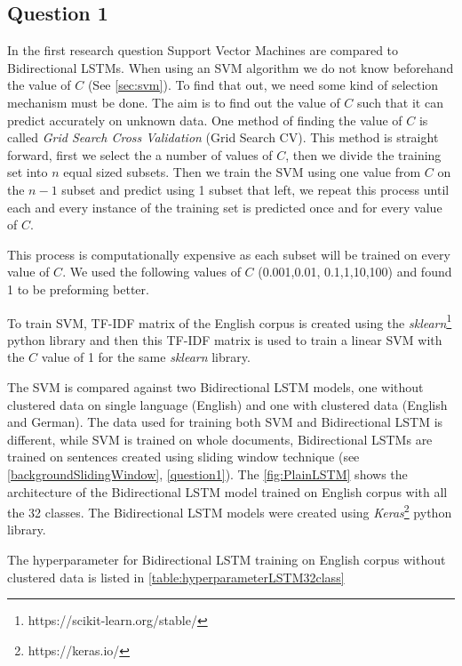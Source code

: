 \subsection{Question 1} \label{impQuestion1}

In the first research question Support Vector Machines are compared to Bidirectional LSTMs. When using an SVM algorithm we do not know beforehand the value of $C$ (See \ref{sec:svm}). To find that out, we need some kind of selection mechanism must be done. The aim is to find out the value of $C$ such that it can predict accurately on unknown data. One method of finding the value of $C$ is called \textit{Grid Search Cross Validation} (Grid Search CV). This method is straight forward, first we select the a number of values of $C$, then we divide the training set into $n$ equal sized subsets. Then we train the SVM using one value from $C$ on the $n-1$ subset and predict using 1 subset that left, we repeat this process until each and every instance of the training set is predicted once and for every value of $C$.

This process is computationally expensive as each subset will be trained on every value of $C$. We used the following values of $C$ (0.001,0.01, 0.1,1,10,100) and found 1 to be preforming better.

To train SVM, TF-IDF matrix of the English corpus is created using the \textit{sklearn}\footnote{https://scikit-learn.org/stable/} python library and then this TF-IDF matrix is used to train a linear SVM with the $C$ value of 1 for the same \textit{sklearn} library. 

The SVM is compared against two Bidirectional LSTM models, one without clustered data on single language (English) and one with clustered data (English and German). The data used for training both SVM and Bidirectional LSTM is different, while SVM is trained on whole documents, Bidirectional LSTMs are trained on sentences created using sliding window technique (see \ref{backgroundSlidingWindow}, \ref{question1}). The \ref{fig:PlainLSTM} shows the architecture of the Bidirectional LSTM model trained on English corpus with all the 32 classes. The Bidirectional LSTM models were created using \textit{Keras}\footnote{https://keras.io/} python library. 

The hyperparameter for Bidirectional LSTM training on English corpus without clustered data is listed in \ref{table:hyperparameterLSTM32class}

